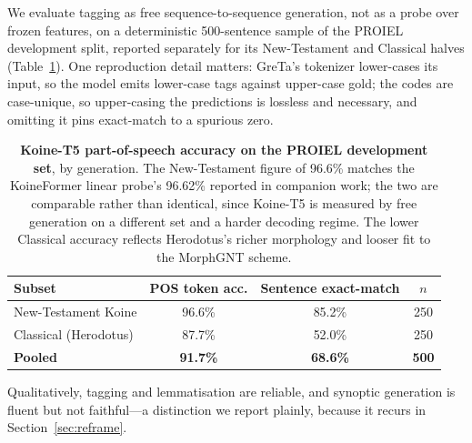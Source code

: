 \documentclass[11pt,letterpaper]{article}
\newcommand{\tblhead}{\rowcolor{marine!12}}
\begin{document}
We evaluate tagging as free sequence-to-sequence generation, not as a probe over frozen features, on a deterministic 500-sentence sample of the PROIEL development split, reported separately for its New-Testament and Classical halves (Table~\ref{tab:koinet5}). One reproduction detail matters: GreTa's tokenizer lower-cases its input, so the model emits lower-case tags against upper-case gold; the codes are case-unique, so upper-casing the predictions is lossless and necessary, and omitting it pins exact-match to a spurious zero.

\begin{table}[H]
\centering
\begin{tabular}{lccc}
\toprule
\tblhead\textbf{Subset} & \textbf{POS token acc.} & \textbf{Sentence exact-match} & \textbf{$n$} \\
\midrule
New-Testament Koine & 96.6\% & 85.2\% & 250 \\
Classical (Herodotus) & 87.7\% & 52.0\% & 250 \\
\rowcolor{terracotta!12}\textbf{Pooled} & \textbf{91.7\%} & \textbf{68.6\%} & \textbf{500} \\
\bottomrule
\end{tabular}
\caption{\textbf{Koine-T5 part-of-speech accuracy on the PROIEL development set}, by generation. The New-Testament figure of 96.6\% matches the KoineFormer linear probe's 96.62\% reported in companion work; the two are comparable rather than identical, since Koine-T5 is measured by free generation on a different set and a harder decoding regime. The lower Classical accuracy reflects Herodotus's richer morphology and looser fit to the MorphGNT scheme.}
\label{tab:koinet5}
\end{table}

Qualitatively, tagging and lemmatisation are reliable, and synoptic generation is fluent but not faithful---a distinction we report plainly, because it recurs in Section~\ref{sec:reframe}.
\end{document}
